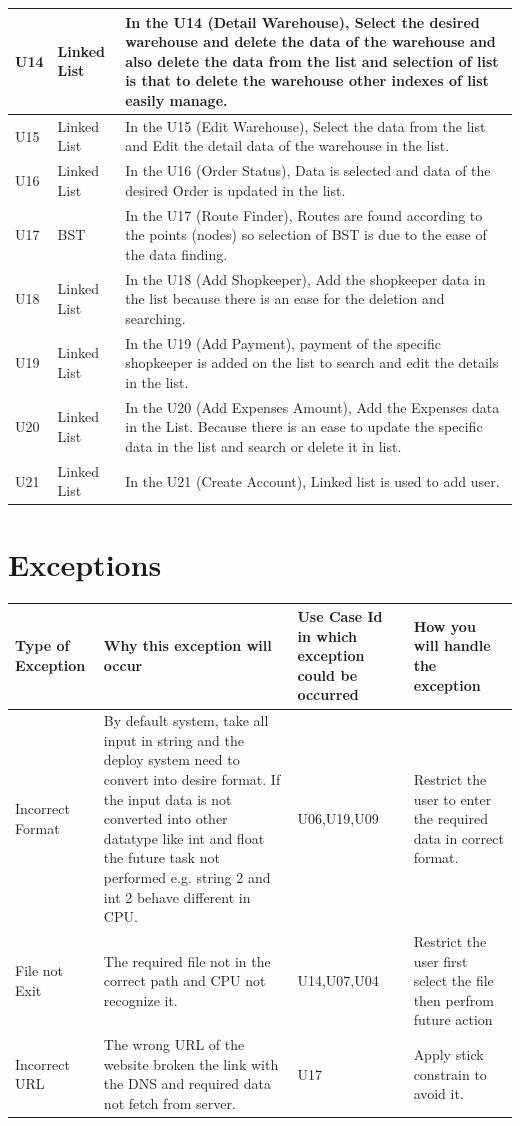\documentclass[12pt,a4paper]{report}
\begin{document}
\begin{tabular}{ | m{2cm} | m{3cm}|m{9cm}| } \hline
U14 &Linked List& In the U14 (Detail Warehouse), Select the desired warehouse and delete the data of the warehouse and also delete the data from the list and selection of list is that to delete the warehouse other indexes of list easily manage.
 
\\ \hline
U15 &Linked List&In the U15 (Edit Warehouse), Select the data from the list and Edit the detail data of the warehouse in the list. 
 
 \\ \hline
U16 &Linked List& In the U16 (Order Status), Data is selected and data of the desired Order is updated in the list.\\ \hline
U17 &BST        & In the U17 (Route Finder), Routes are found according to the points (nodes) so selection of BST is due to the ease of the data finding.\\ \hline
U18 &Linked List&In the U18 (Add Shopkeeper), Add the shopkeeper data in the list because there is an ease for the deletion and searching. \\ \hline
U19 &Linked List& In the U19 (Add Payment), payment of the specific shopkeeper is added on the list to search and edit the details in the list.\\ \hline
U20 &Linked List&In the U20 (Add Expenses Amount), Add the Expenses data in the List. Because there is an ease to update the specific data in the list and search or delete it in list. \\ \hline
U21 &Linked List&In the U21 (Create Account), Linked list is used to add user. \\ \hline

\end{tabular}
\newpage
\chapter {Exceptions}

\begin{tabular}{ | m{2cm} | m{5cm}|m{3cm}||m{4cm}| } \hline
\textbf{Type of Exception} & \textbf{Why this exception will occur} &\textbf{ Use Case Id in which exception could be occurred} & \textbf{How you will handle the} exception \\  \hline
Incorrect Format&By default system, take all input in string and the deploy system need to convert into desire format. If the input data is not converted into other datatype like int and float the future task not performed e.g. string 2 and int 2 behave different in CPU. &U06,U19,U09&Restrict the user to enter the required data in correct format.                      \\  \hline
File not Exit &The required file not in the correct path and CPU not recognize it.&U14,U07,U04&Restrict the user first select the file then perfrom future action
\\  \hline
Incorrect URL& The wrong URL of the website broken the link with the DNS and required data not fetch from server. &U17&Apply stick constrain to avoid it. \\
\hline

\end{tabular}
\newpage
\end{document}
